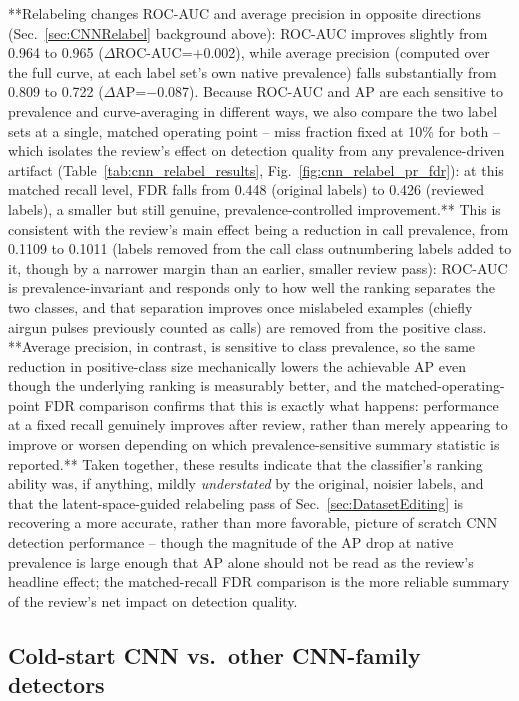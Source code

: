 \documentclass[preprint,NumberedRefs]{JASAnew}
\begin{document}
**Relabeling changes ROC-AUC and average precision in opposite directions
(Sec.~\ref{sec:CNNRelabel} background above): ROC-AUC improves slightly from
0.964 to 0.965 ($\Delta$ROC-AUC=+0.002), while average precision (computed
over the full curve, at each label set's own native prevalence) falls
substantially from 0.809 to 0.722 ($\Delta$AP=$-$0.087). Because ROC-AUC and
AP are each sensitive to prevalence and curve-averaging in different ways, we
also compare the two label sets at a single, matched operating point --
miss fraction fixed at 10\% for both -- which isolates the review's effect
on detection quality from any prevalence-driven artifact
(Table~\ref{tab:cnn_relabel_results}, Fig.~\ref{fig:cnn_relabel_pr_fdr}): at
this matched recall level, FDR falls from 0.448 (original labels) to 0.426
(reviewed labels), a smaller but still genuine, prevalence-controlled
improvement.** This is consistent with the review's main effect being a
reduction in call prevalence, from 0.1109 to 0.1011 (labels removed from the
call class outnumbering labels added to it, though by a narrower margin than
an earlier, smaller review pass): ROC-AUC is prevalence-invariant and
responds only to how well the ranking separates the two classes, and that
separation improves once mislabeled examples (chiefly airgun pulses
previously counted as calls) are removed from the positive class. **Average
precision, in contrast, is sensitive to class prevalence, so the same
reduction in positive-class size mechanically lowers the achievable AP even
though the underlying ranking is measurably better, and the matched-operating-point FDR comparison confirms that this is exactly what happens: performance at a fixed recall genuinely improves after review, rather than merely appearing to improve or worsen depending on which prevalence-sensitive summary statistic is reported.** Taken together, these
results indicate that the classifier's ranking ability was, if anything,
mildly \emph{understated} by the original, noisier labels, and that the
latent-space-guided relabeling pass of Sec.~\ref{sec:DatasetEditing} is
recovering a more accurate, rather than more favorable, picture of scratch
CNN detection performance -- though the magnitude of the AP drop at native
prevalence is large enough that AP alone should not be read as the review's
headline effect; the matched-recall FDR comparison is the more reliable
summary of the review's net impact on detection quality.

\subsection{Cold-start CNN vs.\ other CNN-family detectors}
\label{sec:CNNFamily}
\end{document}
